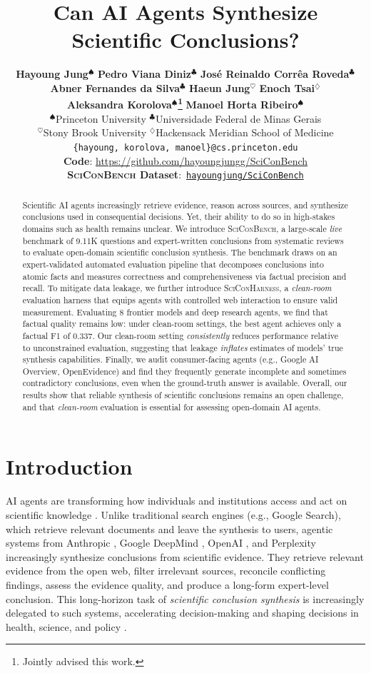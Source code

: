 \documentclass{article}
\title{Can AI Agents Synthesize Scientific Conclusions?}
\author{
    \textbf{Hayoung Jung$^{\spadesuit}$} \quad
    \textbf{Pedro Viana Diniz$^{\clubsuit}$} \quad
    \textbf{José Reinaldo Corrêa Roveda$^{\clubsuit}$} \\
    \textbf{Abner Fernandes da Silva$^{\clubsuit}$} \quad
    \textbf{Haeun Jung$^{\heartsuit}$} \quad 
    \textbf{Enoch Tsai$^{\diamondsuit}$} \quad  \\
    \textbf{Aleksandra Korolova$^{\spadesuit}$\thanks{Jointly advised this work.}} \quad
    \textbf{Manoel Horta Ribeiro$^{\spadesuit}$\footnotemark[1]} \\
    \textnormal{$^{\spadesuit}$Princeton University \quad $^{\clubsuit}$}Universidade Federal de Minas Gerais \\ \textnormal{$^{\heartsuit}$Stony Brook University \quad $^{\diamondsuit}$Hackensack Meridian School of Medicine}
    \vspace{0.2em} \\
    \texttt{\{hayoung, korolova, manoel\}@cs.princeton.edu}
    \vspace{0.2em} \\
    \github \textbf{Code}: \url{https://github.com/hayoungjungg/SciConBench}
    \vspace{0.2em} \\
    \huggingface \textbf{\textsc{SciConBench} Dataset}:~\href{https://huggingface.co/datasets/hayoungjung/SciConBench}{\texttt{hayoungjung/SciConBench}}
} %
\begin{document}
\maketitle


\begin{abstract}
Scientific AI agents increasingly retrieve evidence, reason across sources, and synthesize conclusions used in consequential decisions. Yet, their ability to do so in high-stakes domains such as health remains unclear. We introduce \textsc{SciConBench}, a large-scale \textit{live} benchmark of 9.11K questions and expert-written conclusions from systematic reviews to evaluate open-domain scientific conclusion synthesis. The benchmark draws on an expert-validated automated evaluation pipeline that decomposes conclusions into atomic facts and measures correctness and comprehensiveness via factual precision and recall. To mitigate data leakage, we further introduce \textsc{SciConHarness}, a \textit{clean-room} evaluation harness that equips agents with controlled web interaction to ensure valid measurement. Evaluating 8 frontier models and deep research agents, we find that factual quality remains low: under clean-room settings, the best agent achieves only a factual F1 of 0.337. Our clean-room setting \textit{consistently} reduces performance relative to unconstrained evaluation, suggesting that leakage \textit{inflates} estimates of models' true synthesis capabilities. Finally, we audit consumer-facing agents (e.g., Google AI Overview, OpenEvidence) and find they frequently generate incomplete and sometimes contradictory conclusions, even when the ground-truth answer is available. Overall, our results show that reliable synthesis of scientific conclusions remains an open challenge, and that \textit{clean-room} evaluation is essential for assessing open-domain AI agents.
\end{abstract}

\section{Introduction}

AI agents are transforming how individuals and institutions access and act on scientific knowledge \cite{anthropic2026advancing, openai2026_ai_healthcare_ally, yang2025adoptionusageaiagents}. Unlike traditional search engines (e.g., Google Search), which retrieve relevant documents and leave the synthesis to users, agentic systems from Anthropic \cite{anthropic_claude_research_blog}, Google DeepMind \cite{google_gemini_deep_research}, OpenAI \cite{openai_deep_research_guide}, and Perplexity \cite{perplexity_deep_research_2025} increasingly synthesize conclusions from scientific evidence. They retrieve relevant evidence from the open web, filter irrelevant sources, reconcile conflicting findings, assess the evidence quality, and produce a long-form expert-level conclusion. This long-horizon task of \textit{scientific conclusion synthesis} is increasingly delegated to such systems, accelerating decision-making and shaping decisions in health, science, and policy \cite{openai2026_ai_healthcare_ally, yang2025adoptionusageaiagents}.
\end{document}
